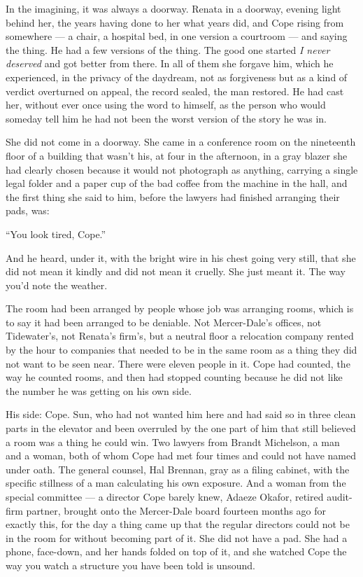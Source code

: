 \documentclass[11pt,openany]{book}
\newcommand{\scenebreak}{\par\vspace{0.5\baselineskip}\begin{center}\textasteriskcentered\quad\textasteriskcentered\quad\textasteriskcentered\end{center}\vspace{0.5\baselineskip}\par}
\begin{document}
In the imagining, it was always a doorway. Renata in a doorway, evening light behind her, the years having done to her what years did, and Cope rising from somewhere --- a chair, a hospital bed, in one version a courtroom --- and saying the thing. He had a few versions of the thing. The good one started \textit{I never deserved} and got better from there. In all of them she forgave him, which he experienced, in the privacy of the daydream, not as forgiveness but as a kind of verdict overturned on appeal, the record sealed, the man restored. He had cast her, without ever once using the word to himself, as the person who would someday tell him he had not been the worst version of the story he was in.

She did not come in a doorway. She came in a conference room on the nineteenth floor of a building that wasn't his, at four in the afternoon, in a gray blazer she had clearly chosen because it would not photograph as anything, carrying a single legal folder and a paper cup of the bad coffee from the machine in the hall, and the first thing she said to him, before the lawyers had finished arranging their pads, was:

``You look tired, Cope.''

And he heard, under it, with the bright wire in his chest going very still, that she did not mean it kindly and did not mean it cruelly. She just meant it. The way you'd note the weather.


\scenebreak


The room had been arranged by people whose job was arranging rooms, which is to say it had been arranged to be deniable. Not Mercer-Dale's offices, not Tidewater's, not Renata's firm's, but a neutral floor a relocation company rented by the hour to companies that needed to be in the same room as a thing they did not want to be seen near. There were eleven people in it. Cope had counted, the way he counted rooms, and then had stopped counting because he did not like the number he was getting on his own side.

His side: Cope. Sun, who had not wanted him here and had said so in three clean parts in the elevator and been overruled by the one part of him that still believed a room was a thing he could win. Two lawyers from Brandt Michelson, a man and a woman, both of whom Cope had met four times and could not have named under oath. The general counsel, Hal Brennan, gray as a filing cabinet, with the specific stillness of a man calculating his own exposure. And a woman from the special committee --- a director Cope barely knew, Adaeze Okafor, retired audit-firm partner, brought onto the Mercer-Dale board fourteen months ago for exactly this, for the day a thing came up that the regular directors could not be in the room for without becoming part of it. She did not have a pad. She had a phone, face-down, and her hands folded on top of it, and she watched Cope the way you watch a structure you have been told is unsound.
\end{document}
